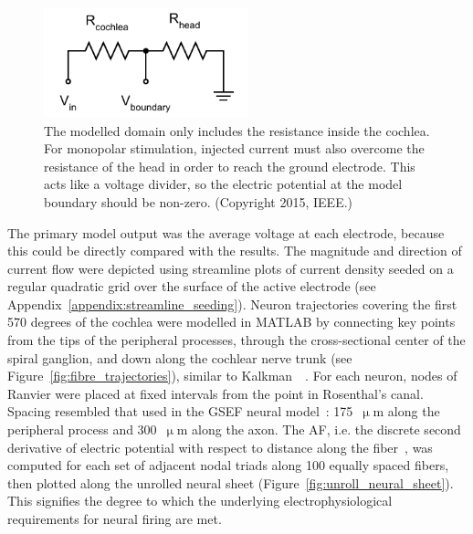 \begin{figure}
	\centering
	\includegraphics[height=3.2cm]{Validation/voltage_divider}
	\caption[Equivalent circuit for the entire head]{The modelled domain
	only includes the resistance inside the cochlea. For monopolar stimulation,
	injected current must also overcome the resistance of the head in order to reach
	the ground electrode. This acts like a voltage divider, so the electric
	potential at the model boundary should be non-zero. (Copyright \textcopyright{}
	2015, IEEE.)}
	\label{fig:voltage_divider}
\end{figure}

The primary model output was the average voltage at each electrode, because this
could be directly compared with the \invivo{} results. The magnitude and
direction of current flow were depicted using streamline plots of current
density seeded on a regular quadratic grid over the surface of the active
electrode (see Appendix~\ref{appendix:streamline_seeding}). Neuron trajectories
covering the first 570 degrees of the cochlea were modelled in MATLAB by
connecting key points from the tips of the peripheral processes, through the
cross-sectional center of the spiral ganglion, and down along the cochlear nerve
trunk (see Figure~\ref{fig:fibre_trajectories}), similar to
Kalkman~\etal~\cite{kalkman2014}. For each neuron, nodes of Ranvier were placed
at fixed intervals from the point in Rosenthal's canal. Spacing resembled that
used in the GSEF neural model~\cite{frijns1995}: 175~$ \upmu $m along the
peripheral process and 300~$ \upmu $m along the axon. The AF, i.e. the discrete
second derivative of electric potential with respect to distance along the
fiber~\cite{reilly1998}, was computed for each set of adjacent nodal triads
along 100 equally spaced fibers, then plotted along the unrolled neural sheet
(Figure~\ref{fig:unroll_neural_sheet}). This signifies the degree to which the
underlying electrophysiological requirements for neural firing are met.

